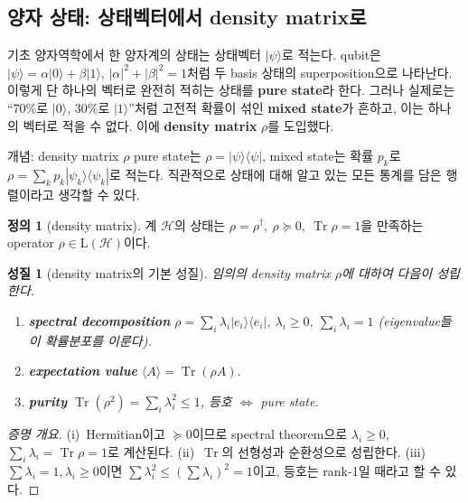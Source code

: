 \documentclass[11pt,a4paper]{article}
\newcommand{\Hcal}{\mathcal{H}}
\newcommand{\Tr}{\operatorname{Tr}}
\newcommand{\Lin}{\mathrm{L}}
\theoremstyle{definition}
\newtheorem{definition}{정의}[section]
\theoremstyle{plain}
\newtheorem{property}{성질}[section]
\theoremstyle{remark}
\begin{document}
\subsection{양자 상태: 상태벡터에서 density matrix로}

기초 양자역학에서 한 양자계의 상태는 상태벡터 $|\psi\rangle$로 적는다. qubit은 $|\psi\rangle=\alpha|0\rangle+\beta|1\rangle$, $|\alpha|^2+|\beta|^2=1$처럼 두 basis 상태의 superposition으로 나타난다. 이렇게 단 하나의 벡터로 완전히 적히는 상태를 \textbf{pure state}라 한다. 그러나 실제로는 ``70\%로 $|0\rangle$, 30\%로 $|1\rangle$''처럼 고전적 확률이 섞인 \textbf{mixed state}가 흔하고, 이는 하나의 벡터로 적을 수 없다. 이에 \textbf{density matrix} $\rho$를 도입했다.

\begin{conceptbox}{개념: density matrix $\rho$}
pure state는 $\rho=|\psi\rangle\langle\psi|$, mixed state는 확률 $p_k$로 $\rho=\sum_k p_k|\psi_k\rangle\langle\psi_k|$로 적는다. 직관적으로 상태에 대해 알고 있는 모든 통계를 담은 행렬이라고 생각할 수 있다.
\end{conceptbox}

\begin{definition}[density matrix]
계 $\Hcal$의 상태는 $\rho=\rho^\dagger,\ \rho\succeq0,\ \Tr\rho=1$을 만족하는 operator $\rho\in\Lin(\Hcal)$이다.
\end{definition}

\begin{property}[density matrix의 기본 성질]\label{prop:density}
임의의 density matrix $\rho$에 대하여 다음이 성립한다.
\begin{enumerate}[label=\textup{(\roman*)}]
  \item \textbf{spectral decomposition} $\rho=\sum_i\lambda_i|e_i\rangle\langle e_i|$, $\lambda_i\ge0,\ \sum_i\lambda_i=1$ (eigenvalue들이 확률분포를 이룬다).
  \item \textbf{expectation value} $\langle A\rangle=\Tr(\rho A)$.
  \item \textbf{purity} $\Tr(\rho^2)=\sum_i\lambda_i^2\le1$, 등호 $\iff$ pure state.
\end{enumerate}
\end{property}
\begin{proof}[증명 개요]
(i)~Hermitian이고 $\succeq0$이므로 spectral theorem으로 $\lambda_i\ge0$, $\sum_i\lambda_i=\Tr\rho=1$로 계산된다. (ii)~$\Tr$의 선형성과 순환성으로 성립한다. (iii)~$\sum\lambda_i=1,\lambda_i\ge0$이면 $\sum\lambda_i^2\le(\sum\lambda_i)^2=1$이고, 등호는 rank-1일 때라고 할 수 있다.
\end{proof}
\end{document}
